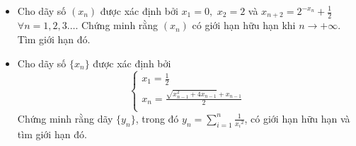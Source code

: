 \documentclass[11pt]{scrartcl}
\begin{document}
\begin{itemize}[label=, leftmargin=0em, itemsep=-0em]
    \item \begin{btvn}
        Cho dãy số $ (x_n)$ được xác định bởi $ x_1 = 0,$ $ x_2 = 2$ và $ x_{n+2} = 2^{-x_n} + \frac{1}{2}$ $ \forall n = 1,2,3 \ldots$. Chứng minh rằng $(x_n)$ có giới hạn hữu hạn khi $ n \to +\infty.$ Tìm giới hạn đó.
    \end{btvn}

    \item \begin{btvn}
        Cho dãy số $ \{x_n\}$ được xác định bởi \[ \left\{ \begin{array}{l}x_1  = \frac{1}{2} \\x_n  = \frac{{\sqrt {x_{n - 1} ^2  + 4x_{n - 1} }  + x_{n - 1} }}{2} \\\end{array} \right.\]
Chứng minh rằng dãy $ \{y_n\}$, trong đó $\displaystyle  y_n=\sum_{i=1}^{n}\frac{1}{{{x}_{i}}^{2}}$, có giới hạn hữu hạn và tìm giới hạn đó.
    \end{btvn}

\end{itemize}
\end{document}
